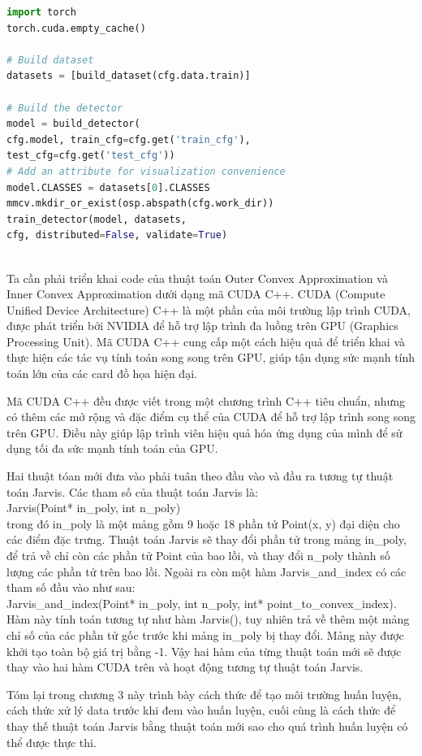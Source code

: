 \documentclass[12pt,a4paper,openany,oneside]{report}
\begin{document}
\begin{lstlisting}[language=python, caption={Câu lệnh để split ảnh trong tập dữ liệu DOTA},
	basicstyle=\fontsize{11}{13}\selectfont,
	keywordstyle=\bfseries,
	label={lst:command-line}]
import torch
torch.cuda.empty_cache()

# Build dataset
datasets = [build_dataset(cfg.data.train)]

# Build the detector
model = build_detector(
cfg.model, train_cfg=cfg.get('train_cfg'),
test_cfg=cfg.get('test_cfg'))
# Add an attribute for visualization convenience
model.CLASSES = datasets[0].CLASSES
mmcv.mkdir_or_exist(osp.abspath(cfg.work_dir))
train_detector(model, datasets,
cfg, distributed=False, validate=True)
	
\end{lstlisting}

Ta cần phải triển khai code của thuật toán Outer Convex Approximation và Inner Convex Approximation dưới dạng mã CUDA C++. CUDA (Compute Unified Device Architecture) C++ là một phần của môi trường lập trình CUDA, được phát triển bởi NVIDIA để hỗ trợ lập trình đa luồng trên GPU (Graphics Processing Unit). Mã CUDA C++ cung cấp một cách hiệu quả để triển khai và thực hiện các tác vụ tính toán song song trên GPU, giúp tận dụng sức mạnh tính toán lớn của các card đồ họa hiện đại.

Mã CUDA C++ đều được viết trong một chương trình C++ tiêu chuẩn, nhưng có thêm các mở rộng và đặc điểm cụ thể của CUDA để hỗ trợ lập trình song song trên GPU. Điều này giúp lập trình viên hiệu quả hóa ứng dụng của mình để sử dụng tối đa sức mạnh tính toán của GPU.

Hai thuật tóan mới đưa vào phải tuân theo đầu vào và đầu ra tương tự thuật toán Jarvis. Các tham số của thuật toán Jarvis là:\\ Jarvis(Point* in\_poly, int n\_poly){}\\ trong đó in\_poly là một mảng gồm 9 hoặc 18 phần tử Point(x, y) đại diện cho các điểm đặc trưng. Thuật toán Jarvis sẽ thay đổi phần tử trong mảng in\_poly, để trả về chỉ còn các phần tử Point của bao lồi, và thay đổi n\_poly thành số lượng các phần tử trên bao lồi. Ngoài ra còn một hàm Jarvis\_and\_index có các tham số đầu vào như sau: \\ Jarvis\_and\_index(Point* in\_poly, int n\_poly, int* point\_to\_convex\_index){}.\\ Hàm này tính toán tương tự như hàm Jarvis(), tuy nhiên trả về thêm một mảng chỉ số của các phần tử gốc trước khi mảng in\_poly bị thay đổi. Mảng này được khởi tạo toàn bộ giá trị bằng -1. Vậy hai hàm của từng thuật toán mới sẽ được thay vào hai hàm CUDA trên và hoạt động tương tự thuật toán Jarvis.

Tóm lại trong chương 3 này trình bày cách thức để tạo môi trường huấn luyện, cách thức xử lý data trước khi đem vào huấn luyện, cuối cùng là cách thức để thay thế thuật toán Jarvis bằng thuật toán mới sao cho quá trình huấn luyện có thể được thực thi.
\end{document}
